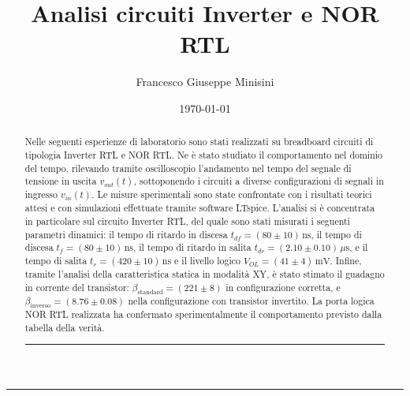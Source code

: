 \documentclass[a4paper,12pt]{article}
\title{Analisi circuiti Inverter e NOR RTL}
\author{Francesco Giuseppe Minisini}
\date{\today}
\begin{document}
\maketitle
\hrule
\vspace{9pt}
\begin{abstract}
    Nelle seguenti esperienze di laboratorio sono stati realizzati su breadboard circuiti di tipologia Inverter RTL e NOR RTL. Ne è stato studiato il comportamento nel dominio del tempo, rilevando tramite oscilloscopio l’andamento nel tempo del segnale di tensione in uscita \(v_{out}(t)\), sottoponendo i circuiti a diverse configurazioni di segnali in ingresso \(v_{in}(t)\). Le misure sperimentali sono state confrontate con i risultati teorici attesi e con simulazioni effettuate tramite software LTspice.
    L’analisi si è concentrata in particolare sul circuito Inverter RTL, del quale sono stati misurati i seguenti parametri dinamici: il tempo di ritardo in discesa \(t_{df} = (80 \pm 10)\,\mathrm{ns}\), il tempo di discesa \(t_f = (80 \pm 10)\,\mathrm{ns}\), il tempo di ritardo in salita \(t_{dr} = (2.10 \pm 0.10)\,\mu\mathrm{s}\), e il tempo di salita \(t_r = (420 \pm 10)\,\mathrm{ns}\) e il livello logico \(V_{OL} = (41 \pm 4)\,\mathrm{mV}\). 
Infine, tramite l’analisi della caratteristica statica in modalità XY, è stato stimato il guadagno in corrente del transistor: \(\beta_{\text{standard}} = (221 \pm 8)\) in configurazione corretta, e \(\beta_{\text{inverso}} = (8.76 \pm 0.08)\) nella configurazione con transistor invertito. La porta logica NOR RTL realizzata ha confermato sperimentalmente il comportamento previsto dalla tabella della verità.

    \vspace{20 pt}
\hrule
\end{abstract}
\vspace{2 pt}
\end{document}
